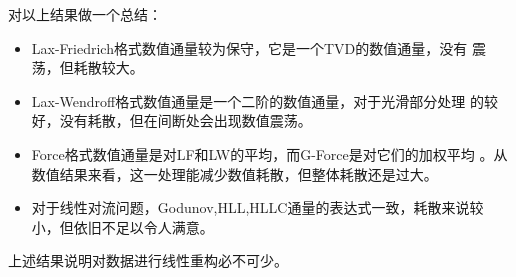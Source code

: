 \documentclass[a4paper,  11pt]{ctexart}
\begin{document}
\begin{figure}[H]
\end{figure}
对以上结果做一个总结：
\begin{itemize}
  \item Lax-Friedrich格式数值通量较为保守，它是一个TVD的数值通量，没有
    震荡，但耗散较大。
  \item Lax-Wendroff格式数值通量是一个二阶的数值通量，对于光滑部分处理
    的较好，没有耗散，但在间断处会出现数值震荡。
  \item Force格式数值通量是对LF和LW的平均，而G-Force是对它们的加权平均
    。从数值结果来看，这一处理能减少数值耗散，但整体耗散还是过大。
  \item 对于线性对流问题，Godunov,HLL,HLLC通量的表达式一致，耗散来说较
    小，但依旧不足以令人满意。
\end{itemize}
\newpage
上述结果说明对数据进行线性重构必不可少。
\end{document}
